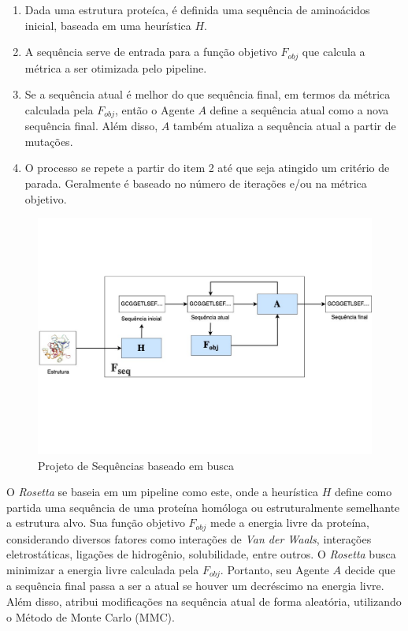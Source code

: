 \begin{enumerate}
  \item Dada uma estrutura proteíca, é definida uma sequência de aminoácidos inicial, baseada em uma  heurística $H$.
  \item A sequência serve de entrada para a função objetivo $F_{obj}$ que calcula a métrica a ser otimizada pelo pipeline.
  \item Se a sequência atual é melhor do que sequência final, em termos da métrica calculada pela $F_{obj}$, então o Agente $A$ define a sequência atual como a nova sequência final. Além disso, $A$ também atualiza a sequência atual a partir de mutações.
  \item O processo se repete a partir do item 2 até que seja atingido um critério de parada. Geralmente é baseado no número de iterações e/ou na métrica objetivo. 
\end{enumerate}

\begin{figure}[H]
  \centering
  \includegraphics[width=.8\textwidth]{figuras/metodologia-SearchBased.pdf}
  \caption{Projeto de Sequências baseado em busca} 
  \label{fig:seqdes_search_based}
\end{figure}


O \textit{Rosetta} \cite{Rosetta} se baseia em um pipeline como este, onde a heurística $H$ define como partida uma sequência de uma proteína homóloga ou estruturalmente semelhante a estrutura alvo.  
Sua função objetivo $F_{obj}$ mede a energia livre da proteína, considerando diversos fatores como interações de \textit{Van der Waals}, interações eletrostáticas, ligações de hidrogênio, solubilidade, entre outros. 
O \textit{Rosetta} busca minimizar a energia livre calculada pela $F_{obj}$. Portanto, seu Agente $A$ 
decide que a sequência final passa a ser a atual se houver um decréscimo na energia livre. Além disso, atribui modificações na sequência atual de forma aleatória, utilizando o Método de Monte Carlo (MMC).

